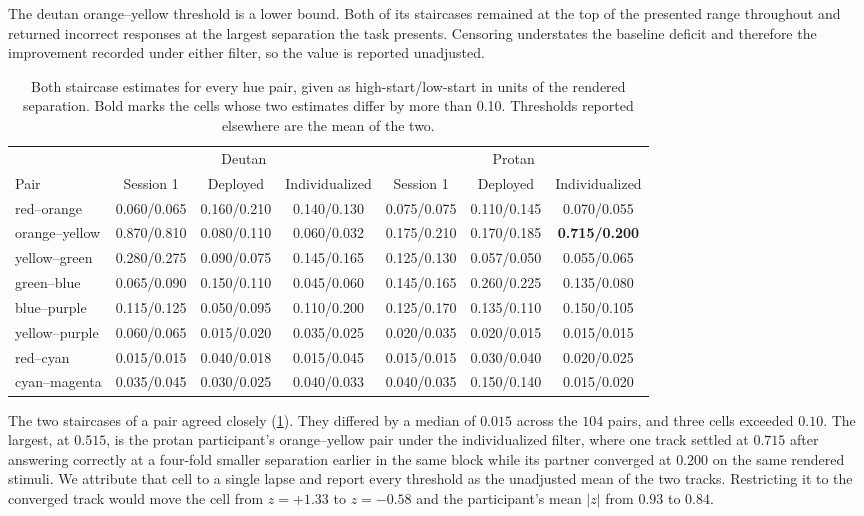 The deutan orange--yellow threshold is a lower bound. Both of its staircases remained at the top of the presented range throughout and returned incorrect responses at the largest separation the task presents. Censoring understates the baseline deficit and therefore the improvement recorded under either filter, so the value is reported unadjusted.

\begin{table}[h]\centering\small
\caption{Both staircase estimates for every hue pair, given as high-start/low-start in units of the rendered separation. Bold marks the cells whose two estimates differ by more than 0.10. Thresholds reported elsewhere are the mean of the two.}
\label{tab:staircase_pairs}
\begin{tabular}{lcccccc}
\toprule
 & \multicolumn{3}{c}{Deutan} & \multicolumn{3}{c}{Protan} \\
\cmidrule(lr){2-4}\cmidrule(lr){5-7}
Pair & Session 1 & Deployed & Individualized & Session 1 & Deployed & Individualized \\
\midrule
red--orange & 0.060/0.065 & 0.160/0.210 & 0.140/0.130 & 0.075/0.075 & 0.110/0.145 & 0.070/0.055 \\
orange--yellow & 0.870/0.810 & 0.080/0.110 & 0.060/0.032 & 0.175/0.210 & 0.170/0.185 & \textbf{0.715/0.200} \\
yellow--green & 0.280/0.275 & 0.090/0.075 & 0.145/0.165 & 0.125/0.130 & 0.057/0.050 & 0.055/0.065 \\
green--blue & 0.065/0.090 & 0.150/0.110 & 0.045/0.060 & 0.145/0.165 & 0.260/0.225 & 0.135/0.080 \\
blue--purple & 0.115/0.125 & 0.050/0.095 & 0.110/0.200 & 0.125/0.170 & 0.135/0.110 & 0.150/0.105 \\
yellow--purple & 0.060/0.065 & 0.015/0.020 & 0.035/0.025 & 0.020/0.035 & 0.020/0.015 & 0.015/0.015 \\
red--cyan & 0.015/0.015 & 0.040/0.018 & 0.015/0.045 & 0.015/0.015 & 0.030/0.040 & 0.020/0.025 \\
cyan--magenta & 0.035/0.045 & 0.030/0.025 & 0.040/0.033 & 0.040/0.035 & 0.150/0.140 & 0.015/0.020 \\
\bottomrule\end{tabular}\end{table}

The two staircases of a pair agreed closely (\cref{tab:staircase_pairs}). They differed by a median of $0.015$ across the $104$ pairs, and three cells exceeded $0.10$. The largest, at $0.515$, is the protan participant's orange--yellow pair under the individualized filter, where one track settled at $0.715$ after answering correctly at a four-fold smaller separation earlier in the same block while its partner converged at $0.200$ on the same rendered stimuli. We attribute that cell to a single lapse and report every threshold as the unadjusted mean of the two tracks. Restricting it to the converged track would move the cell from $z = +1.33$ to $z = -0.58$ and the participant's mean $|z|$ from $0.93$ to $0.84$.




